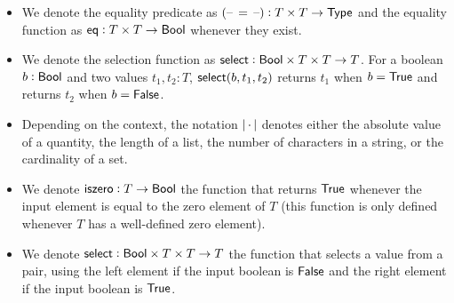 \begin{itemize}
    \item We denote the equality predicate as $({\textrm{--}}\,=\,{\textrm{--}}) : T \times T \to {\textsf{Type}}$ and the equality function as ${\textsf{eq}} : T \times T \to {\textsf{Bool}}$ whenever they exist.
    \item We denote the selection function as ${\textsf{select}}: {\textsf{Bool}} \times T \times T \to T$. For a boolean $b: {\textsf{Bool}}$ and two values $t_1, t_2 : T$, ${\textsf{select}}(b, t_1, t_2)$ returns $t_1$ when $b={\textsf{True}}$ and returns $t_2$ when $b={\textsf{False}}$.
    \item Depending on the context, the notation $\left|\,\cdot\,\right|$ denotes either the absolute value of a quantity, the length of a list, the number of characters in a string, or the cardinality of a set.
    \item We denote ${\textsf{iszero}} : T \to {\textsf{Bool}}$ the function that returns ${\textsf{True}}$ whenever the input element is equal to the zero element of $T$ (this function is only defined whenever $T$ has a well-defined zero element).
    \item We denote ${\textsf{select}} : {\textsf{Bool}} \times T \times T \to T$ the function that selects a value from a pair, using the left element if the input boolean is ${\textsf{False}}$ and the right element if the input boolean is ${\textsf{True}}$.
\end{itemize}

